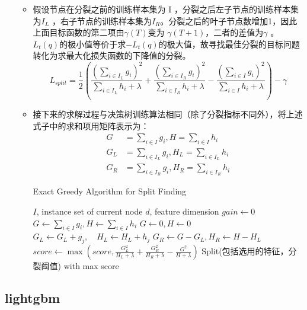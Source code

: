 \documentclass[UTF8]{article}%
\begin{document}
\begin{enumerate}
\begin{itemize}
\begin{equation}
					\end{equation}
					\item 假设节点在分裂之前的训练样本集为 I ，分裂之后左子节点的训练样本集为$ I_L$ ，右子节点的训练样本集为$ I_R $。分裂之后的叶子节点数增加1，因此上面目标函数的第二项由$ \gamma (T) $变为 $\gamma(T+1) $，二者的差值为$ \gamma$ 。$L_t(q) $的极小值等价于求$ -L_t(q) $的极大值，故寻找最佳分裂的目标问题转化为求最大化损失函数的下降值的分裂。
					$$
					L_{s p l i t}=\frac{1}{2}\left(\frac{\left(\sum_{i \in I_{L}} g_{i}\right)^{2}}{\sum_{i \in I_{L}} h_{i}+\lambda}+\frac{\left(\sum_{i \in I_{R}} g_{i}\right)^{2}}{\sum_{i \in I_{R}} h_{i}+\lambda}-\frac{\left(\sum_{i \in I} g_{i}\right)^{2}}{\sum_{i \in I} h_{i}+\lambda}\right)-\gamma
					$$
					\item 接下来的求解过程与决策树训练算法相同（除了分裂指标不同外），将上述式子中的求和项用矩阵表示为：
					$$
					\begin{aligned} 
					G&=\sum_{i \in I} g_{i}, H=\sum_{i \in I} h_{i} \\
					G_{L} &=\sum_{i \in I_{L}} g_{i}, H_{L}=\sum_{i \in I_{L}} h_{i} \\ 
					G_{R} &=\sum_{i \in I_{R}} g_{i}, H_{R}=\sum_{i \in I_{R}} h_{i}
					 \end{aligned}
					$$
					\begin{algorithm}[h]
						\caption{Exact Greedy Algorithm for Split Finding} %
						\label{algMergeSubCluste}
						\begin{algorithmic}[1]
							\REQUIRE $I$, instance set of current node
							\REQUIRE $d$, feature dimension
							\STATE$gain \gets 0$
							\STATE$G \leftarrow \sum_{i \in I} g_{i}, H \leftarrow \sum_{i \in I} h_{i}$
							\STATE$G \leftarrow 0, H \leftarrow 0$
							\STATE$G_{L} \leftarrow G_{L}+g_{j}, \quad H_{L} \leftarrow H_{L}+h_{j}$
							\STATE$G_{R} \leftarrow G-G_{L}, H_{R} \leftarrow H-H_{L}$
							\STATE$score\leftarrow \max \left(score,\frac{G_{L}^{2}}{H_{L}+\lambda}+\frac{G_{R}^{2}}{H_{R}+\lambda}-\frac{G^{2}}{H+\lambda}\right)$
							\ENDFOR
							\ENDFOR
							\ENSURE Split(包括选用的特征，分裂阈值) with max score
						\end{algorithmic}
					\end{algorithm}
				\end{itemize}
		\end{enumerate}
	
		\subsection{lightgbm}
\end{document}
